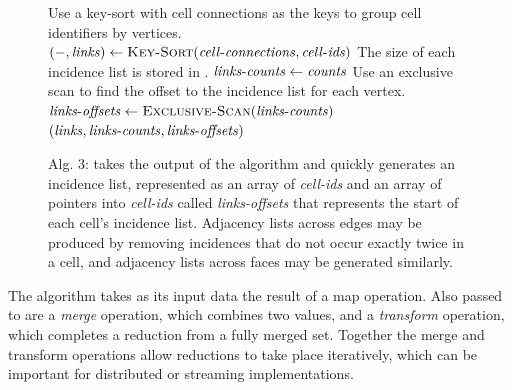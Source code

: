 \documentclass[10pt,journal,cspaper,compsoc]{IEEEtran}
\begin{document}
\noindent
\begin{figure}[tb]
 \vspace{-0.4cm}
 \begin{codebox}
   \zi \Comment Use a key-sort with cell connections as the keys to
   \zi \Comment group cell identifiers by vertices.
   \li $(-, \id{links}) \gets \proc{Key-Sort}(\id{cell-connections},\id{cell-ids})$
   \zi \Comment The size of each incidence list is stored in .
   \li $\id{links-counts} \gets \id{counts}$
   \zi \Comment Use an exclusive scan to find the offset to the
   \zi \Comment incidence list for each vertex.
   \li $\id{links-offsets} \gets \proc{Exclusive-Scan}(\id{links-counts})$
   \li \Return $(\id{links},\id{links-counts},\id{links-offsets})$
 \end{codebox}
 \vspace{-0.4cm}
 \caption*{Alg. 3:  takes the output of the  algorithm and quickly generates an incidence list, represented as an array of \emph{cell-ids} and an array of pointers into \emph{cell-ids} called \emph{links-offsets} that represents the start of each cell's incidence list. Adjacency lists across edges may be produced by removing incidences that do not occur exactly twice in a cell, and adjacency lists across faces may be generated similarly. }
\end{figure}

The  algorithm takes as its input data the result of a map
operation.  Also passed to  are a \emph{merge} operation, which
combines two values, and a \emph{transform} operation, which completes a
reduction from a fully merged set.  Together the merge and transform
operations allow reductions to take place iteratively, which can be
important for distributed or streaming implementations.
\end{document}
